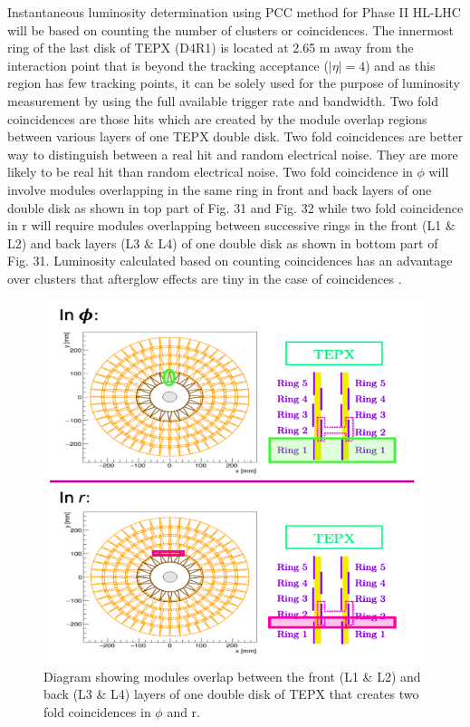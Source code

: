 Instantaneous luminosity determination using PCC method for Phase II HL-LHC will be based on counting the number of clusters or coincidences. The innermost ring of the last disk of TEPX (D4R1) is located at 2.65 m away from the interaction point that is beyond the tracking acceptance ($|\eta| = 4$) and as this region has few tracking points, it can be solely used for the purpose of luminosity measurement by using the full available trigger rate and bandwidth. Two fold coincidences are those hits which are created by the module overlap regions between various layers of one TEPX double disk. Two fold coincidences are better way to distinguish between a real hit and random electrical noise. They are more likely to be real hit than random electrical noise. Two fold coincidence in $\phi$ will involve modules overlapping in the same ring in front and back layers of one double disk as shown in top part of Fig. 31 and Fig. 32 while two fold coincidence in r will require modules overlapping between successive rings in the front (L1 $\&$ L2) and back layers (L3 $\&$ L4) of one double disk as shown in bottom part of Fig. 31. Luminosity calculated based on counting coincidences has an advantage over clusters that afterglow effects are tiny in the case of coincidences  \cite{Collaboration:2706512} \cite{brilsim} \cite{brilsim1}\cite{brilsim2}.\\



\begin{figure}[H]
  \centering
  \includegraphics[width=0.8\columnwidth]{./2foldinrphi.png}
  \caption{ \onehalfspacing Diagram showing modules overlap between the front (L1 \& L2) and back (L3 \& L4) layers of one double disk of TEPX that creates two fold coincidences in $\phi$ and r.}
  \label{fig:CMS}
\end{figure}

